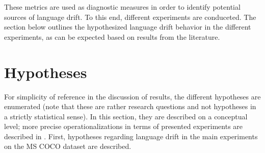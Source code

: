 These metrics are used as diagnostic measures in order to identify potential sources of language drift. To this end, different experiments are conduceted. The section below outlines the hypothesized language drift behavior in the different experiments, as can be expected based on results from the literature.

\section{Hypotheses}
\label{hypos}

For simplicity of reference in the discussion of results, the different hypotheses are enumerated (note that these are rather research questions and not hypotheses in a strictly statistical sense). In this section, they are described on a conceptual level; more precise operationalizations in terms of presented experiments are described in .
First, hypotheses regarding language drift in the main experiments on the MS COCO dataset are described. 

